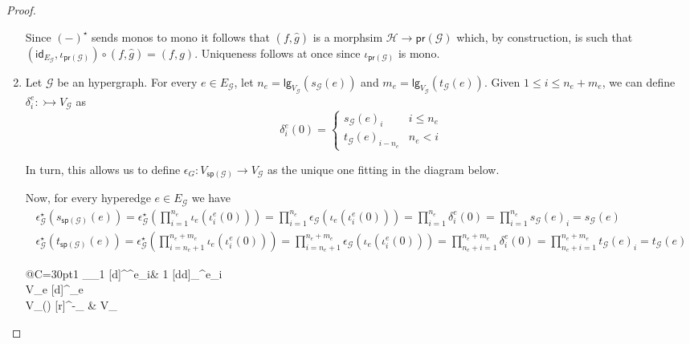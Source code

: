 \documentclass[3p]{elsarticle}
\newcommand{\lgh}{\mathsf{lg}}
\renewcommand{\sp}{\mathsf{sp}}
\newcommand{\pr}{\mathsf{pr}}
\newcommand{\mto}{\rightarrowtail}
\newcommand{\id}[1]{\mathsf{id}_{#1}}
\theoremstyle{remark}
\theoremstyle{definition}
\begin{document}
\begin{proof}
\begin{enumerate}
 Since $(-)^\star$ sends monos to mono it follows that $(f, \hat{g})$ is a morphsim $\mathcal{H}\to \pr(\mathcal{G}) $ which, by construction, is such that $(\id{E_{\mathcal{G}}}, \iota_{\pr(\mathcal{G})})\circ (f, \hat{g}) = (f,g)$.
  Uniqueness follows at once since $\iota_{\pr(\mathcal{G})}$ is mono.
 
\item Let $\mathcal{G}$ be an hypergraph. For every $e\in E_{\mathcal{G}}$, let $n_e=\lgh_{V_{\mathcal{G}}}(s_{\mathcal{G}}(e))$ and $m_e=\lgh_{V_{\mathcal{G}}}(t_{\mathcal{G}}(e))$. Given $1\leq i\leq n_e+m_e$,  we can define $\delta^e_i\colon \mto V_{\mathcal{G}}$ as
\[\delta^e_i(0) =\begin{cases}
	s_{\mathcal{G}}(e)_i & i\leq n_e\\
	t_{\mathcal{G}}(e)_{i-n_e} &  n_e < i
\end{cases}\]

In turn, this allows us to define $\epsilon_{G}\colon V_{\sp(\mathcal{G})}\to V_{\mathcal{G}}$ as the unique one fitting in the diagram below.

\noindent 
\begin{minipage}[l]{.8\linewidth}
	\setlength{\parindent}{1.5em}
	Now, for every hyperedge $e\in E_{\mathcal{G}}$ we have
	\begin{gather*}
		\epsilon_{\mathcal{G}}^\star(s_{\sp(\mathcal{G})}(e)) = \epsilon_{\mathcal{G}}^\star(\prod_{i=1}^{n_e} \iota_e(\iota^e_{i}(0)))=\prod_{i=1}^{n_e} \epsilon_{\mathcal{G}}(\iota_e(\iota^e_{i}(0)))=\prod_{i=1}^{n_e} \delta^e_i(0) =\prod_{i=1}^{n_e} s_{\mathcal{G}}(e)_i=   s_{\mathcal{G}}(e)\\
		\epsilon_{\mathcal{G}}^\star(t_{\sp(\mathcal{G})}(e)) = \epsilon_{\mathcal{G}}^\star(\prod_{i=n_e+1}^{n_e + m_e} \iota_e(\iota^e_{i}(0)))=\prod_{i=n_e+1}^{n_e + m_e} \epsilon_{\mathcal{G}}(\iota_e(\iota^e_{i}(0)))=\prod_{n_e+i=1}^{n_e + m_e} \delta^e_i(0) = \prod_{n_e+i=1}^{n_e + m_e}  t_{\mathcal{G}}(e)_i  = t_{\mathcal{G}}(e)
	\end{gather*} 
\end{minipage}
\hfill
\begin{minipage}[r]{.3\linewidth} \vspace{-.9cm}
	\xymatrix@R=10pt@C=30pt{1 \ar[r]_{\id{1}} \ar@{>->}[d]^{\iota^e_i}& 1 \ar@{>->}[dd]_{\delta^e_i}\\ V_e \ar@{>->}[d]^{\iota_e}  \\ V_{\sp()} ^-{\epsilon_{}} &  V_{}}
\end{minipage}


\end{enumerate}
\end{proof}
\end{document}
